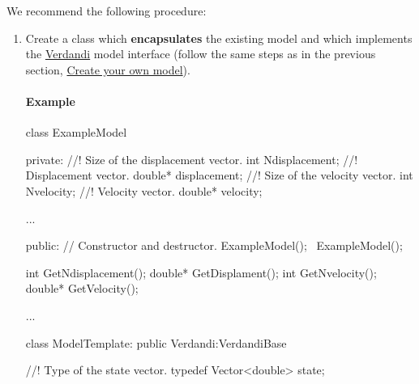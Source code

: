 \documentclass{tufte-book}
\begin{document}
\-We recommend the following procedure\-:
\begin{enumerate}
\item \-Create a class which {\bfseries encapsulates} the existing model and which implements the \hyperlink{namespace_verdandi}{\-Verdandi} model interface (follow the same steps as in the previous section, \hyperlink{plugging_model_own_model}{\-Create your own model}).

\paragraph{Example}



\begin{frame_cpp}
class ExampleModel
{

    private:
        //! Size of the displacement vector.
        int Ndisplacement;
        //! Displacement vector.
        double* displacement;
        //! Size of the velocity vector.
        int Nvelocity;
        //! Velocity vector.
        double* velocity;

        ...

    public:
        // Constructor and destructor.
        ExampleModel();
        ~ExampleModel();

        int GetNdisplacement();
        double* GetDisplament();
        int GetNvelocity();
        double* GetVelocity();


        	...
}
\end{frame_cpp}


\begin{frame_cpp}
class ModelTemplate: public Verdandi:VerdandiBase
{
    //! Type of the state vector.
     typedef Vector<double> state;

}
\end{frame_cpp}
\end{enumerate}
\end{document}
